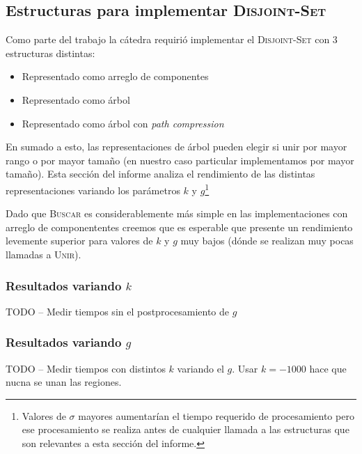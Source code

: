 \subsection{Estructuras para implementar \textsc{Disjoint-Set}}

Como parte del trabajo la cátedra requirió implementar el \textsc{Disjoint-Set}
con 3 estructuras distintas:

\begin{itemize}
	\item Representado como arreglo de componentes
	\item Representado como árbol
	\item Representado como árbol con \emph{path compression}
\end{itemize}

En sumado a esto, las representaciones de árbol pueden elegir si unir por mayor
rango o por mayor tamaño (en nuestro caso particular implementamos por mayor
tamaño). Esta sección del informe analiza el rendimiento de las distintas
representaciones variando los parámetros $k$ y $g$\footnote{Valores de $\sigma$
mayores aumentarían el tiempo requerido de procesamiento pero ese procesamiento
se realiza antes de cualquier llamada a las estructuras que son relevantes a
esta sección del informe.}

Dado que \textsc{Buscar} es considerablemente más simple en las
implementaciones con arreglo de componententes creemos que es esperable que
presente un rendimiento levemente superior para valores de $k$ y $g$ muy bajos
(dónde se realizan muy pocas llamadas a \textsc{Unir}).

\subsubsection{Resultados variando $k$}

TODO -- Medir tiempos sin el postprocesamiento de $g$

\subsubsection{Resultados variando $g$}

TODO -- Medir tiempos con distintos $k$ variando el $g$. Usar $k = -1000$ hace
que nucna se unan las regiones.
